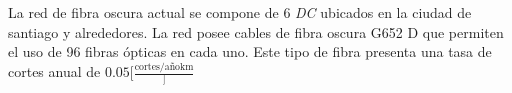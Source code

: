 La red de fibra oscura actual se compone de 6 {\em DC\/} ubicados en
la ciudad de santiago y alrededores. La red posee cables de fibra
oscura G652 D que permiten el uso de 96 fibras ópticas en cada
uno. Este tipo de fibra presenta una tasa de cortes anual de $0.05
[\frac{\text{cortes}/\text{año} \text{km}}]$